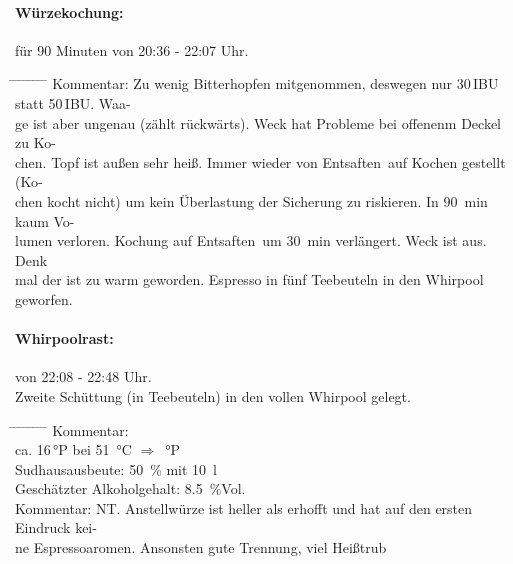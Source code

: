 \documentclass[12pt,oneside,a4paper]{scrartcl}
\begin{document}
\paragraph{Würzekochung:} für 90 Minuten von 20:36 - 22:07 Uhr.
	\begin{tabbing}
		\hspace{1cm} \= \hspace{1cm} \= \hspace{1cm} \= \hspace{1cm} \= \hspace{1cm} \= \hspace{1cm} \= \hspace{1cm} \= \hspace{1cm} \= \kill
		\> Kommentar: \> \> \> Zu wenig Bitterhopfen mitgenommen, deswegen nur 30\,IBU statt 50\,IBU. Waa-\\
		\> \> \>ge ist aber ungenau (zählt rückwärts). Weck hat Probleme bei offenenm Deckel zu Ko-\\
		\> \> \>chen. Topf ist außen sehr heiß. Immer wieder von \glqq Entsaften\grqq\ auf Kochen gestellt (Ko-\\
		\>\>\>chen kocht nicht) um kein Überlastung der Sicherung zu riskieren. In \SI{90}{\minute} kaum Vo-\\
		\>\>\>lumen verloren. Kochung auf \glqq Entsaften\grqq\ um \SI{30}{\minute} verlängert. Weck ist aus. Denk\\
		\>\>\>mal der ist zu warm geworden. Espresso in fünf Teebeuteln in den Whirpool geworfen.\\
	\end{tabbing}

\paragraph{Whirpoolrast:} von 22:08 - 22:48 Uhr.\\

\hspace{1cm} Zweite Schüttung (in Teebeuteln) in den vollen Whirpool gelegt.
	\begin{tabbing}
		\hspace{1cm} \= \hspace{1cm} \= \hspace{1cm} \= \hspace{1cm} \= \hspace{1cm} \= \hspace{1cm} \= \hspace{1cm} \= \hspace{1cm} \= \kill
		\> Kommentar: \>\>\>  \\
		\> \> \> ca. 16\,°P \> \> bei \> \SI{51}{\celsius} \> $\Rightarrow$ \,°P\\
		\> \> Sudhausausbeute: \> \> \> \> \>  \SI{50}{\percent} mit \SI{10}{\litre}\\
		\> \> Geschätzter Alkoholgehalt: \> \> \> \> \> \SI{8,5}{\percent}Vol.\\
		\>Kommentar: \>\>\>NT. Anstellwürze ist heller als erhofft und hat auf den ersten Eindruck kei-\\
		\>\>\>ne Espressoaromen. Ansonsten gute Trennung, viel Heißtrub
	\end{tabbing}
%
\end{document}
